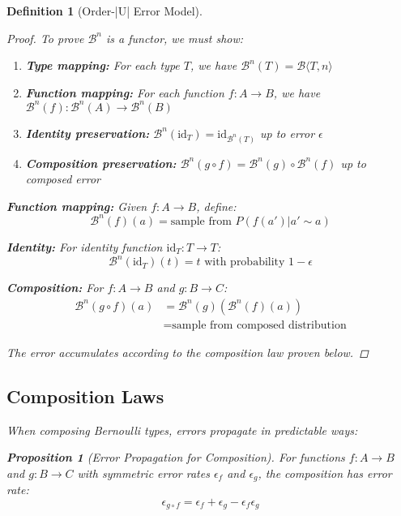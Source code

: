 \documentclass[11pt,final,hidelinks]{article}
\newtheorem{proposition}[theorem]{Proposition}
\newtheorem{definition}[theorem]{Definition}
\newcommand{\bernoulli}[2]{\mathcal{B}\langle #1, #2 \rangle}
\begin{document}
\begin{definition}[Order-|U| Error Model]
\begin{proof}
To prove $\mathcal{B}^n$ is a functor, we must show:
\begin{enumerate}
    \item \textbf{Type mapping:} For each type $T$, we have $\mathcal{B}^n(T) = \bernoulli{T}{n}$
    \item \textbf{Function mapping:} For each function $f: A \to B$, we have $\mathcal{B}^n(f): \mathcal{B}^n(A) \to \mathcal{B}^n(B)$
    \item \textbf{Identity preservation:} $\mathcal{B}^n(\text{id}_T) = \text{id}_{\mathcal{B}^n(T)}$ up to error $\epsilon$
    \item \textbf{Composition preservation:} $\mathcal{B}^n(g \circ f) = \mathcal{B}^n(g) \circ \mathcal{B}^n(f)$ up to composed error
\end{enumerate}

\textbf{Function mapping:} Given $f: A \to B$, define:
\begin{equation}
\mathcal{B}^n(f)(a) = \text{sample from } P(f(a') | a' \sim a)
\end{equation}

\textbf{Identity:} For identity function $\text{id}_T: T \to T$:
\begin{equation}
\mathcal{B}^n(\text{id}_T)(t) = t \text{ with probability } 1 - \epsilon
\end{equation}

\textbf{Composition:} For $f: A \to B$ and $g: B \to C$:
\begin{align}
\mathcal{B}^n(g \circ f)(a) &= \mathcal{B}^n(g)(\mathcal{B}^n(f)(a)) \\
&= \text{sample from composed distribution}
\end{align}

The error accumulates according to the composition law proven below.
\end{proof}

\subsection{Composition Laws}

When composing Bernoulli types, errors propagate in predictable ways:

\begin{proposition}[Error Propagation for Composition]
For functions $f: A \to B$ and $g: B \to C$ with symmetric error rates $\epsilon_f$ and $\epsilon_g$, the composition has error rate:
\begin{equation}
\epsilon_{g \circ f} = \epsilon_f + \epsilon_g - \epsilon_f \epsilon_g
\end{equation}
\end{proposition}


\end{definition}
\end{document}
